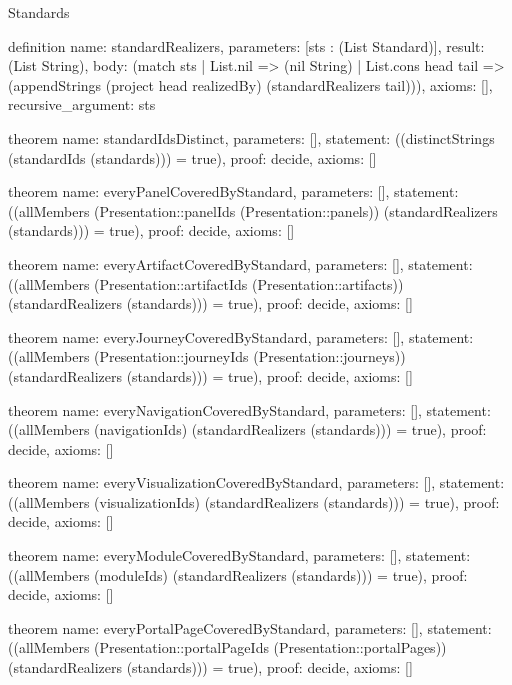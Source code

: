 \begin{lexlean}{Standards}
\begin{semanticmodule}
definition{
  name: standardRealizers,
  parameters: [sts : (List Standard)],
  result: (List String),
  body: (match sts
    | List.nil => (nil String)
    | List.cons head tail => (appendStrings (project head realizedBy) (standardRealizers tail))),
  axioms: [],
  recursive_argument: sts
}

theorem{
  name: standardIdsDistinct,
  parameters: [],
  statement: ((distinctStrings (standardIds (standards))) = true),
  proof: decide{},
  axioms: []
}

theorem{
  name: everyPanelCoveredByStandard,
  parameters: [],
  statement: ((allMembers (Presentation::panelIds (Presentation::panels)) (standardRealizers (standards))) = true),
  proof: decide{},
  axioms: []
}

theorem{
  name: everyArtifactCoveredByStandard,
  parameters: [],
  statement: ((allMembers (Presentation::artifactIds (Presentation::artifacts)) (standardRealizers (standards))) = true),
  proof: decide{},
  axioms: []
}

theorem{
  name: everyJourneyCoveredByStandard,
  parameters: [],
  statement: ((allMembers (Presentation::journeyIds (Presentation::journeys)) (standardRealizers (standards))) = true),
  proof: decide{},
  axioms: []
}

theorem{
  name: everyNavigationCoveredByStandard,
  parameters: [],
  statement: ((allMembers (navigationIds) (standardRealizers (standards))) = true),
  proof: decide{},
  axioms: []
}

theorem{
  name: everyVisualizationCoveredByStandard,
  parameters: [],
  statement: ((allMembers (visualizationIds) (standardRealizers (standards))) = true),
  proof: decide{},
  axioms: []
}

theorem{
  name: everyModuleCoveredByStandard,
  parameters: [],
  statement: ((allMembers (moduleIds) (standardRealizers (standards))) = true),
  proof: decide{},
  axioms: []
}

theorem{
  name: everyPortalPageCoveredByStandard,
  parameters: [],
  statement: ((allMembers (Presentation::portalPageIds (Presentation::portalPages)) (standardRealizers (standards))) = true),
  proof: decide{},
  axioms: []
}
\end{semanticmodule}
\end{lexlean}
